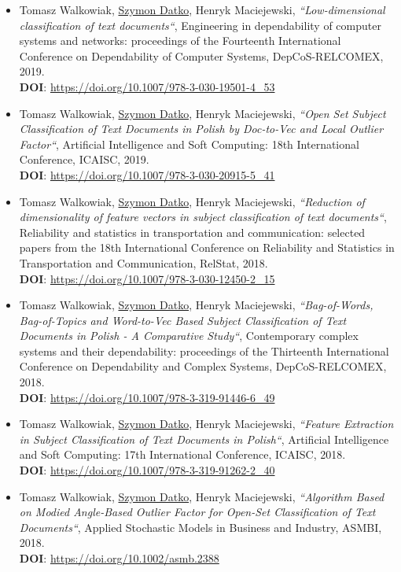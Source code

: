 \begin{itemize}
    \item
        Tomasz Walkowiak, \underline{Szymon Datko}, Henryk Maciejewski,
        \textit{“Low-dimensional classification of text documents“},
        Engineering in dependability of computer systems and networks: proceedings of the Fourteenth International Conference on Dependability of Computer Systems, DepCoS-RELCOMEX, 2019.\\
        \textbf{DOI}: \url{https://doi.org/10.1007/978-3-030-19501-4_53}

    \item
        Tomasz Walkowiak, \underline{Szymon Datko}, Henryk Maciejewski,
        \textit{“Open Set Subject Classification of Text Documents in Polish by Doc-to-Vec and Local Outlier Factor“},
        Artificial Intelligence and Soft Computing: 18th International Conference, ICAISC, 2019.\\
        \textbf{DOI}: \url{https://doi.org/10.1007/978-3-030-20915-5_41}

    \item
        Tomasz Walkowiak, \underline{Szymon Datko}, Henryk Maciejewski,
        \textit{“Reduction of dimensionality of feature vectors in subject classification of text documents“},
        Reliability and statistics in transportation and communication: selected papers from the 18th International Conference on Reliability and Statistics in Transportation and Communication, RelStat, 2018.\\
        \textbf{DOI}: \url{https://doi.org/10.1007/978-3-030-12450-2_15}

    \item
        Tomasz Walkowiak, \underline{Szymon Datko}, Henryk Maciejewski,
        \textit{“Bag-of-Words, Bag-of-Topics and Word-to-Vec Based Subject Classification of Text Documents in Polish - A Comparative Study“},
        Contemporary complex systems and their dependability: proceedings of the Thirteenth International Conference on Dependability and Complex Systems, DepCoS-RELCOMEX, 2018.\\
        \textbf{DOI}: \url{https://doi.org/10.1007/978-3-319-91446-6_49}

    \item
        Tomasz Walkowiak, \underline{Szymon Datko}, Henryk Maciejewski,
        \textit{“Feature Extraction in Subject Classification of Text Documents in Polish“},
        Artificial Intelligence and Soft Computing: 17th International Conference, ICAISC, 2018.\\
        \textbf{DOI}: \url{https://doi.org/10.1007/978-3-319-91262-2_40}

    \item
        Tomasz Walkowiak, \underline{Szymon Datko}, Henryk Maciejewski,
        \textit{“Algorithm Based on Modied Angle-Based Outlier Factor for Open-Set Classification of Text Documents“},
        Applied Stochastic Models in Business and Industry, ASMBI, 2018.\\
        \textbf{DOI}: \url{https://doi.org/10.1002/asmb.2388}
\end{itemize}



